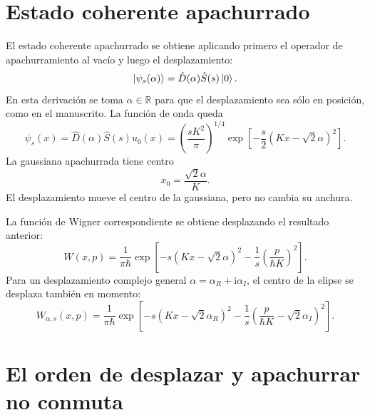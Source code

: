 \documentclass[11pt]{article}
\newcommand{\ii}{\mathrm{i}}
\begin{document}
\section{Estado coherente apachurrado}

El estado coherente apachurrado se obtiene aplicando primero el operador de
apachurramiento al vac\'io y luego el desplazamiento:
\begin{equation}
  \ket{\psi_s(\alpha)}
  =
  \hat D(\alpha)\hat S(s)\ket0.
\end{equation}
En esta derivaci\'on se toma $\alpha\in\mathbb R$ para que el desplazamiento
sea s\'olo en posici\'on, como en el manuscrito. La funci\'on de onda queda
\begin{equation}
  \boxed{
  \psi_s(x)
  =
  \hat D(\alpha)\hat S(s)u_0(x)
  =
  \left(\frac{sK^2}{\pi}\right)^{1/4}
  \exp\left[
  -\frac{s}{2}(Kx-\sqrt2\alpha)^2
  \right].
  }
\end{equation}
La gaussiana apachurrada tiene centro
\begin{equation}
  x_0=\frac{\sqrt2\alpha}{K}.
\end{equation}
El desplazamiento mueve el centro de la gaussiana, pero no cambia su anchura.

La funci\'on de Wigner correspondiente se obtiene desplazando el resultado
anterior:
\begin{equation}
  \boxed{
  W(x,p)
  =
  \frac{1}{\pi\hbar}
  \exp\left[
  -s(Kx-\sqrt2\alpha)^2
  -\frac{1}{s}\left(\frac{p}{\hbar K}\right)^2
  \right].
  }
\end{equation}
Para un desplazamiento complejo general $\alpha=\alpha_R+\ii\alpha_I$, el
centro de la elipse se desplaza tambi\'en en momento:
\begin{equation}
  W_{\alpha,s}(x,p)
  =
  \frac{1}{\pi\hbar}
  \exp\left[
  -s(Kx-\sqrt2\alpha_R)^2
  -\frac{1}{s}\left(\frac{p}{\hbar K}-\sqrt2\alpha_I\right)^2
  \right].
\end{equation}

\section{El orden de desplazar y apachurrar no conmuta}
\end{document}

